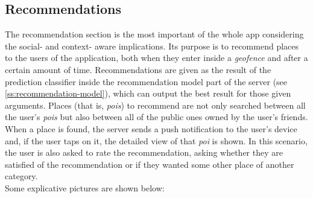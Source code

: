 \documentclass[../../main]{subfiles}
\begin{document}
\subsection{Recommendations}
\label{ss:final-recommendations}

The recommendation section is the most important of the whole app considering the social- and context- aware implications.
Its purpose is to recommend places to the users of the application, both when they enter inside a \textit{geofence} and after a certain amount of time.
Recommendations are given as the result of the prediction classifier inside the recommendation model part of the server (see \ref{ss:recommendation-model}), which can output the best result for those given arguments. 
Places (that is, \textit{pois}) to recommend are not only searched between all the user's \textit{pois} but also between all of the public ones owned by the user's friends.
When a place is found, the server sends a push notification to the user's device and, if the user taps on it, the detailed view of that \textit{poi} is shown.
In this scenario, the user is also asked to rate the recommendation, asking whether they are satisfied of the recommendation or if they wanted some other place of another category.\\
Some explicative pictures are shown below:
\end{document}
